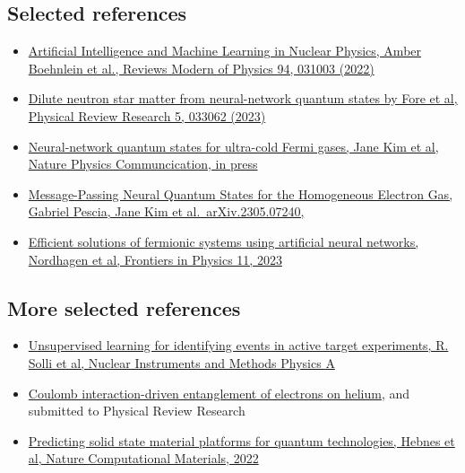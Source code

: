\documentclass[%
oneside,                 %
final,                   %
10pt]{article}
\begin{document}
\subsection{Selected references}
\begin{block}{}
\begin{itemize}
\item \href{{https://journals.aps.org/rmp/abstract/10.1103/RevModPhys.94.031003}}{Artificial Intelligence and Machine Learning in Nuclear Physics, Amber Boehnlein et al., Reviews Modern of Physics 94, 031003 (2022)} 

\item \href{{https://journals.aps.org/prresearch/pdf/10.1103/PhysRevResearch.5.033062}}{Dilute neutron star matter from neural-network quantum states by Fore et al, Physical Review Research 5, 033062 (2023)}

\item \href{{https://doi.org/10.48550/arXiv.2305.08831}}{Neural-network quantum states for ultra-cold Fermi gases, Jane Kim et al, Nature Physics Communcication, in press}

\item \href{{https://doi.org/10.48550/arXiv.2305.07240}}{Message-Passing Neural Quantum States for the Homogeneous Electron Gas, Gabriel Pescia, Jane Kim et al.~arXiv.2305.07240,}

\item \href{{https://doi.org/10.3389/fphy.2023.1061580}}{Efficient solutions of fermionic systems using artificial neural networks, Nordhagen et al, Frontiers in Physics 11, 2023}
\end{itemize}

\noindent
\end{block}

\subsection{More selected references}
\begin{block}{}
\begin{itemize}
\item \href{{https://www.sciencedirect.com/science/article/abs/pii/S0168900221004460?via%

\item \href{{https://arxiv.org/abs/2310.04927}}{Coulomb interaction-driven entanglement of electrons on helium}, and submitted to Physical Review Research

\item \href{{https://www.nature.com/articles/s41524-022-00888-3}}{Predicting solid state material platforms for quantum technologies, Hebnes et al, Nature Computational Materials, 2022} 
\end{itemize}

\noindent
\end{block}
\end{document}
